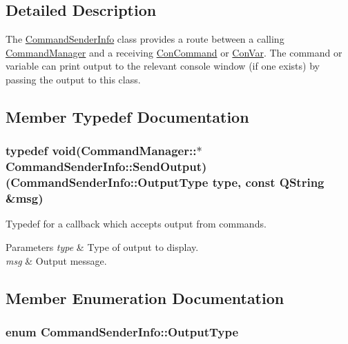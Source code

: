 \subsection{Detailed Description}
The \hyperlink{class_command_sender_info}{Command\-Sender\-Info} class provides a route between a calling \hyperlink{class_command_manager}{Command\-Manager} and a receiving \hyperlink{class_con_command}{Con\-Command} or \hyperlink{class_con_var}{Con\-Var}. The command or variable can print output to the relevant console window (if one exists) by passing the output to this class. 

\subsection{Member Typedef Documentation}
\hypertarget{class_command_sender_info_a68c494ef69a25ac7bf667b83e24639ed}{
\subsubsection[{Send\-Output}]{\setlength{\rightskip}{0pt plus 5cm}typedef void(Command\-Manager\-::$\ast$ Command\-Sender\-Info\-::\-Send\-Output)({\bf Command\-Sender\-Info\-::\-Output\-Type} type, const Q\-String \&msg)}}\label{class_command_sender_info_a68c494ef69a25ac7bf667b83e24639ed}


Typedef for a callback which accepts output from commands. 


\begin{DoxyParams}{Parameters}
{\em type} & Type of output to display. \\
\hline
{\em msg} & Output message. \\
\hline
\end{DoxyParams}


\subsection{Member Enumeration Documentation}
\hypertarget{class_command_sender_info_a3a5e6a2ef1772f6557f351652c2e3b60}{
\subsubsection[{Output\-Type}]{\setlength{\rightskip}{0pt plus 5cm}enum {\bf Command\-Sender\-Info\-::\-Output\-Type}}}\label{class_command_sender_info_a3a5e6a2ef1772f6557f351652c2e3b60}



